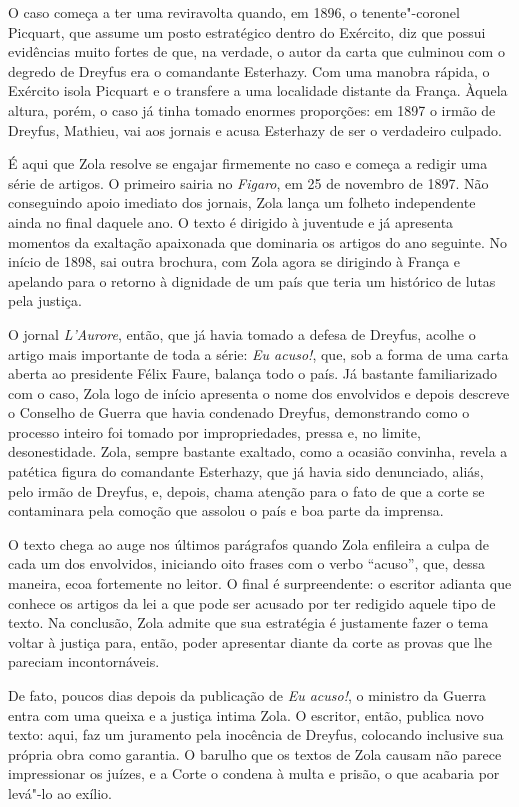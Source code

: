 O caso começa a ter uma reviravolta quando, em 1896, o tenente"-coronel Picquart, 
que assume um posto estratégico dentro do Exército, diz que
possui evidências muito fortes de que, na verdade, o autor da carta que
culminou com o degredo de Dreyfus era o comandante Esterhazy. Com uma
manobra rápida, o Exército isola Picquart e o transfere a uma
localidade distante da França. Àquela altura, porém, o caso já tinha
tomado enormes proporções: em 1897 o irmão de Dreyfus, Mathieu, vai aos
jornais e acusa Esterhazy de ser o verdadeiro culpado. 

 É aqui que Zola resolve se engajar firmemente no caso e começa a
redigir uma série de artigos. O primeiro sairia no \textit{Figaro}, em
25 de novembro de 1897. Não conseguindo apoio imediato dos jornais,
Zola lança um folheto independente ainda no final daquele ano. O texto
é dirigido à juventude e já apresenta momentos da exaltação apaixonada
que dominaria os artigos do ano seguinte. No início de 1898, sai outra
brochura, com Zola agora se dirigindo à França e apelando para o
retorno à dignidade de um país que teria um histórico de lutas pela
justiça.

 O jornal \textit{L'Aurore}, então, que já havia tomado a defesa de
Dreyfus, acolhe o artigo mais importante de toda a série:
\textit{Eu acuso!}, que, sob a forma de uma carta aberta ao presidente
Félix Faure, balança todo o país. Já bastante familiarizado com o caso,
Zola logo de início apresenta o nome dos envolvidos e depois descreve o
Conselho de Guerra que havia condenado Dreyfus, demonstrando como o
processo inteiro foi tomado por impropriedades, pressa e, no limite,
desonestidade. Zola, sempre bastante exaltado, como a ocasião convinha,
revela a patética figura do comandante Esterhazy, que já havia sido
denunciado, aliás, pelo irmão de Dreyfus, e, depois, chama atenção para
o fato de que a corte se contaminara pela comoção que assolou o país e
boa parte da imprensa.

 O texto chega ao auge nos últimos parágrafos quando Zola enfileira a
culpa de cada um dos envolvidos, iniciando oito frases com o verbo
“acuso”, que, dessa maneira, ecoa fortemente no leitor. O final é
surpreendente: o escritor adianta que conhece os artigos da lei a que
pode ser acusado por ter redigido aquele tipo de texto. Na conclusão,
Zola admite que sua estratégia é justamente fazer o tema voltar à
justiça para, então, poder apresentar diante da corte as provas que lhe
pareciam incontornáveis.

 De fato, poucos dias depois da publicação de \textit{Eu acuso!}, o ministro
da Guerra entra com uma queixa e a justiça intima Zola. O escritor,
então, publica novo texto: aqui, faz um juramento pela inocência de
Dreyfus, colocando inclusive sua própria obra como garantia. O barulho
que os textos de Zola causam não parece impressionar os juízes, e a
Corte o condena à multa e prisão, o que acabaria por levá"-lo ao
exílio. 

